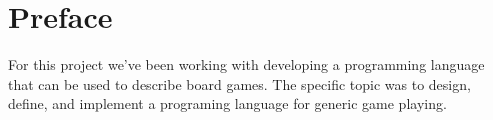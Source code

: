 \chapter*{Preface}
\label{chap:preface}

For this project we've been working with developing a programming language that can be used to describe board games. The specific topic was to design, define, and implement a programing language for generic game playing. 



